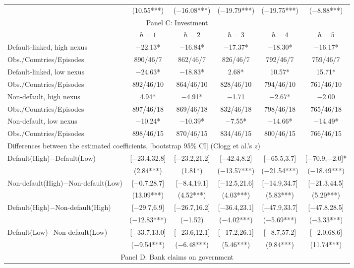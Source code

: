 \documentclass[12pt]{article}
\begin{document}
\begin{longtable}{lccccc}
 & (10.55***) & ($-$16.08***) & ($-$19.79***) & ($-$19.75***) & ($-$8.88***) \\[5pt]
\multicolumn{6}{c}{\large Panel C: Investment} \\
\toprule
 & $h=1$ & $h=2$ & $h=3$ & $h=4$ & $h=5$ \\
\midrule
Default-linked, high nexus & $-$22.13* & $-$16.84* & $-$17.37* & $-$18.30* & $-$16.17* \\
Obs./Countries/Episodes & 890/46/7 & 862/46/7 & 826/46/7 & 792/46/7 & 759/46/7 \\[2pt]
Default-linked, low nexus & $-$24.63* & $-$18.83* & 2.68* & 10.57* & 15.71* \\
Obs./Countries/Episodes & 892/46/10 & 864/46/10 & 828/46/10 & 794/46/10 & 761/46/10 \\[2pt]
Non-default, high nexus & 4.94* & $-$4.91* & $-$1.71 & $-$2.67* & $-$2.00 \\
Obs./Countries/Episodes & 897/46/18 & 869/46/18 & 832/46/18 & 798/46/18 & 765/46/18 \\[2pt]
Non-default, low nexus & $-$10.24* & $-$10.39* & $-$7.55* & $-$14.66* & $-$14.49* \\
Obs./Countries/Episodes & 898/46/15 & 870/46/15 & 834/46/15 & 800/46/15 & 766/46/15 \\[4pt]
\multicolumn{6}{l}{Differences between the estimated coefficients, [bootstrap 95\% CI] (Clogg et al.'s $z$)} \\[2pt]
Default(High)$-$Default(Low) & [$-$23.4,32.8] & [$-$23.2,21.2] & [$-$42.4,8.2] & [$-$65.5,3.7] & [$-$70.9,$-$2.0]* \\
 & (2.84***) & (1.81*) & ($-$13.57***) & ($-$21.54***) & ($-$18.49***) \\[2pt]
Non-default(High)$-$Non-default(Low) & [$-$0.7,28.7] & [$-$8.4,19.1] & [$-$12.5,21.6] & [$-$14.9,34.7] & [$-$21.3,44.5] \\
 & (13.09***) & (4.52***) & (4.03***) & (5.83***) & (5.29***) \\[6pt]
Default(High)$-$Non-default(High) & [$-$29.7,6.9] & [$-$26.7,16.2] & [$-$36.4,23.1] & [$-$47.9,33.7] & [$-$47.8,28.5] \\
 & ($-$12.83***) & ($-$1.52) & ($-$4.02***) & ($-$5.69***) & ($-$3.33***) \\[2pt]
Default(Low)$-$Non-default(Low) & [$-$33.7,13.0] & [$-$23.6,12.1] & [$-$17.2,26.1] & [$-$8.7,57.2] & [$-$2.0,68.6] \\
 & ($-$9.54***) & ($-$6.48***) & (5.46***) & (9.84***) & (11.74***) \\[5pt]
\multicolumn{6}{c}{\large Panel D: Bank claims on government} \\

\end{longtable}
\end{document}
